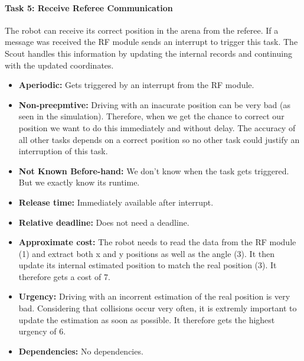 \documentclass[12pt]{article}
\begin{document}
\paragraph{Task 5: Receive Referee Communication}
The robot can receive its correct position in the arena from the referee. If a message was received the RF module sends an interrupt to trigger this task. The Scout handles this information by updating the internal records and continuing with the updated coordinates.
    \begin{itemize}
	\item \textbf{Aperiodic:} Gets triggered by an interrupt from the RF module.
	\item \textbf{Non-preepmtive:} Driving with an inacurate position can be very bad (as seen in the simulation). Therefore, when we get the chance to correct our position we want to do this immediately and without delay. The accuracy of all other tasks depends on a correct position so no other task could justify an interruption of this task.
  	\item \textbf{Not Known Before-hand:} We don't know when the task gets triggered. But we exactly know its runtime.
  	\item \textbf{Release time:} Immediately available after interrupt.
  	\item \textbf{Relative deadline:} Does not need a deadline.
  	\item \textbf{Approximate cost:} The robot needs to read the data from the RF module (1) and extract both x and y positions as well as the angle (3). It then update its internal estimated position to match the real position (3). It therefore gets a cost of 7.
  	\item \textbf{Urgency:} Driving with an incorrent estimation of the real position is very bad. Considering that collisions occur very often, it is extremly important to update the estimation as soon as possible. It therefore gets the highest urgency of 6.
  	\item \textbf{Dependencies:} No dependencies.
   	\end{itemize}
\end{document}
